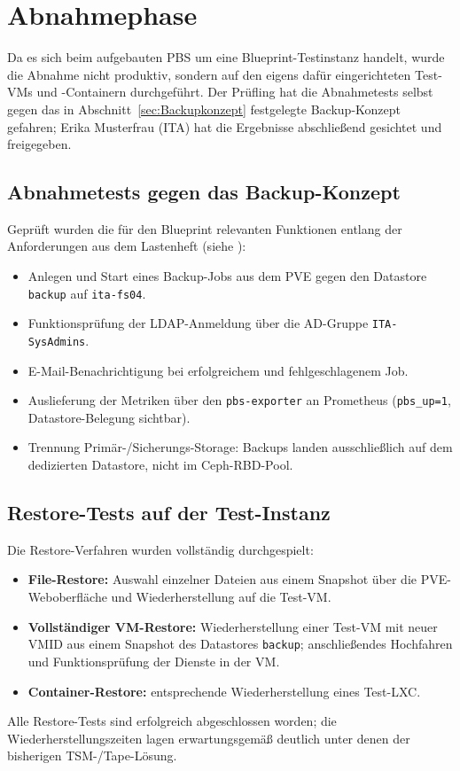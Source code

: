 \section{Abnahmephase}
\label{sec:Abnahmephase}

Da es sich beim aufgebauten \ac{PBS} um eine Blueprint-Testinstanz
handelt, wurde die Abnahme nicht produktiv, sondern auf den
eigens dafür eingerichteten Test-\acp{VM} und -Containern
durchgeführt. Der Prüfling hat die Abnahmetests selbst gegen das
in Abschnitt~\ref{sec:Backupkonzept} festgelegte Backup-Konzept
gefahren; Erika Musterfrau (\ac{ITA}) hat die Ergebnisse abschließend
gesichtet und freigegeben.

\subsection{Abnahmetests gegen das Backup-Konzept}
Geprüft wurden die für den Blueprint relevanten Funktionen entlang
der Anforderungen aus dem Lastenheft (siehe ):
\begin{itemize}\setlength{\itemsep}{1pt}
    \item Anlegen und Start eines Backup-Jobs aus dem \ac{PVE}
          gegen den Datastore \texttt{backup} auf
          \texttt{ita-fs04}.
    \item Funktionsprüfung der \ac{LDAP}-Anmeldung über die
          \ac{AD}-Gruppe \texttt{ITA-SysAdmins}.
    \item E-Mail-Benachrichtigung bei erfolgreichem und
          fehlgeschlagenem Job.
    \item Auslieferung der Metriken über den
          \texttt{pbs-exporter} an Prometheus
          (\texttt{pbs\_up=1}, Datastore-Belegung sichtbar).
    \item Trennung Primär-/Sicherungs-Storage: Backups landen
          ausschließlich auf dem dedizierten Datastore, nicht im
          Ceph-\ac{RBD}-Pool.
\end{itemize}

\subsection{Restore-Tests auf der Test-Instanz}
Die Restore-Verfahren wurden vollständig durchgespielt:
\begin{itemize}\setlength{\itemsep}{1pt}
    \item \textbf{File-Restore:} Auswahl einzelner Dateien aus einem
          Snapshot über die \ac{PVE}-Weboberfläche und
          Wiederherstellung auf die Test-\ac{VM}.
    \item \textbf{Vollständiger \ac{VM}-Restore:} Wiederherstellung
          einer Test-\ac{VM} mit neuer VMID aus einem Snapshot des
          Datastores \texttt{backup}; anschließendes Hochfahren und
          Funktionsprüfung der Dienste in der \ac{VM}.
    \item \textbf{Container-Restore:} entsprechende
          Wiederherstellung eines Test-\ac{LXC}.
\end{itemize}
Alle Restore-Tests sind erfolgreich abgeschlossen worden; die
Wiederherstellungszeiten lagen erwartungsgemäß deutlich unter
denen der bisherigen \ac{TSM}-/Tape-Lösung.


